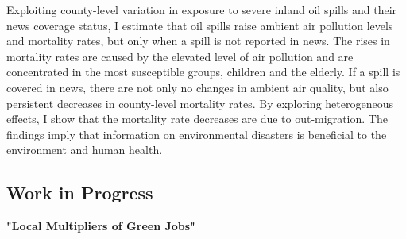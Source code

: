\documentclass[letterpaper]{article}
\renewenvironment{itemize}{
  \begin{list}{}{
    \setlength{\leftmargin}{0.35em}
  }
}{
  \end{list}
}
\begin{document}
\begin{itemize}
Exploiting county-level variation in exposure to severe inland oil spills and their news coverage status, I estimate that oil spills raise ambient air pollution levels and mortality rates, but only when a spill is not reported in news. The rises in mortality rates are caused by the elevated level of air pollution and are concentrated in the most susceptible groups, children and the elderly. If a spill is covered in news, there are not only no changes in ambient air quality, but also persistent decreases in county-level mortality rates. By exploring heterogeneous effects, I show that the mortality rate decreases are due to out-migration. The findings imply that information on environmental disasters is beneficial to the environment and human health.

\end{itemize}

\subsection*{Work in Progress}
\begin{itemize}
\item \textbf{"Local Multipliers of Green Jobs"}
\end{itemize}
\end{document}
